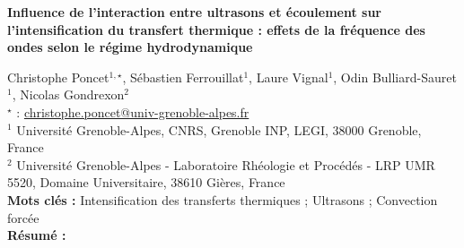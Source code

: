 


    \newpage


%
\begin{flushleft}
\addtocounter{section}{1}
{\Large \textbf{Influence de l'interaction entre ultrasons et écoulement sur l'intensification du transfert thermique : effets de la fréquence des ondes selon le régime hydrodynamique}}\label{ref:19}
\end{flushleft}
%
Christophe Poncet$^{1,\star}$, Sébastien Ferrouillat$^{1}$, Laure Vignal$^{1}$, Odin Bulliard-Sauret$^{1}$, Nicolas Gondrexon$^{2}$\\[2mm]
$^{\star}$ \Letter : \url{christophe.poncet@univ-grenoble-alpes.fr}\\[2mm]
{\footnotesize $^{1}$ Université Grenoble-Alpes, CNRS, Grenoble INP, LEGI, 38000 Grenoble, France}\\
{\footnotesize $^{2}$ Université Grenoble-Alpes - Laboratoire Rhéologie et Procédés - LRP UMR 5520, Domaine Universitaire, 38610 Gières, France}\\
[4mm]
%
\noindent \textbf{Mots clés : } Intensification des transferts thermiques ; Ultrasons ; Convection forcée\\[4mm]
%
\noindent \textbf{Résumé : } 

